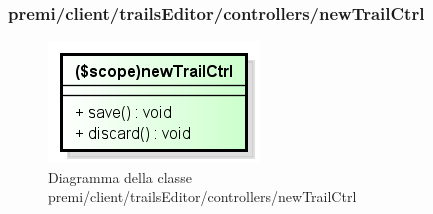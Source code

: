 	
	
	
	
	
	
	
	
	
\subsubsection{premi/client/trailsEditor/controllers/newTrailCtrl}
\begin{figure}[h]
\begin{center}
\includegraphics[scale=0.55]{img/diacla/newTrailCtrl.png}
\caption{Diagramma della classe premi/client/trailsEditor/controllers/newTrailCtrl}
\end{center}
\end{figure}


